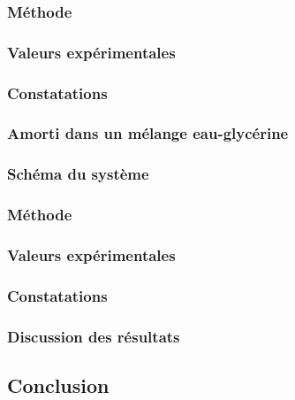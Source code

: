             \subsubsection{Méthode}
    
            \subsubsection{Valeurs expérimentales}
    
            \subsubsection{Constatations}
    
    
            \subsubsection{Amorti dans un mélange eau-glycérine}
            \subsubsection{Schéma du système}
    
            \subsubsection{Méthode}
    
            \subsubsection{Valeurs expérimentales}
    
            \subsubsection{Constatations}
    
    
            \subsubsection{Discussion des résultats}
    
        \subsection{Conclusion}
                   
    


    
    
        
